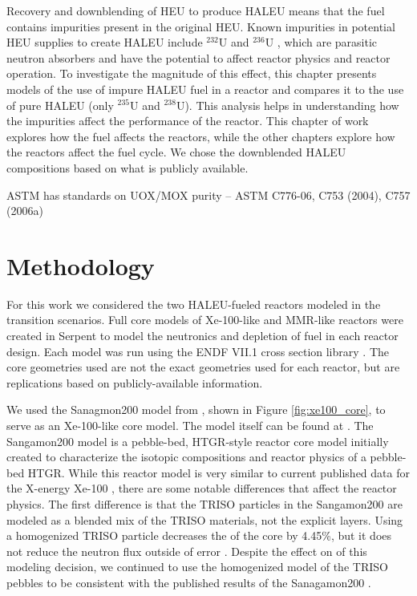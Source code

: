 Recovery and downblending of \gls{HEU} to produce \gls{HALEU} means that 
the fuel contains impurities present in the original
\gls{HEU}. Known impurities in potential \gls{HEU}
supplies to create \gls{HALEU} include $^{232}$U and $^{236}$U
\cite{vaden_isotopic_2018,nelson_foreign_2010},  
which are parasitic neutron absorbers and have the potential to affect 
reactor physics and reactor operation. To investigate the magnitude of this 
effect, this chapter presents models of the use of 
impure \gls{HALEU} fuel in a reactor and compares it to the use of pure 
\gls{HALEU} (only $^{235}$U and $^{238}$U). This analysis helps in 
understanding how the impurities affect the performance of the reactor.
This chapter of work explores how the fuel affects the reactors, while 
the other chapters explore how the reactors affect the fuel cycle. We chose 
the downblended \gls{HALEU} compositions based on what is publicly 
available. 




ASTM has standards on UOX/MOX purity -- ASTM C776-06, C753 (2004), C757 (2006a)

\section{Methodology}
For this work we considered the two \gls{HALEU}-fueled reactors modeled 
in the transition scenarios. Full core models of Xe-100-like and 
\gls{MMR}-like reactors were created in Serpent 
\cite{leppanen_serpent_2014} to model the neutronics and depletion of fuel 
in each reactor design. Each model was run using the ENDF VII.1 
cross section library
\cite{chadwick_endfb-vii1_2011}. The core geometries used are not 
the exact geometries used for each reactor, but are replications based 
on publicly-available information. 

We used the Sanagmon200 model from \cite{richter_isotopic_2022}, shown in 
Figure \ref{fig:xe100_core}, to serve as an Xe-100-like 
core model. The model itself can be found at \cite{richter_zoerichterphlox_2022}.
The Sangamon200 model is a pebble-bed, \gls{HTGR}-style reactor core model 
initially created to characterize the isotopic compositions and 
reactor physics of a pebble-bed \gls{HTGR}. While this reactor model 
is very similar to current published data for the X-energy Xe-100
\cite{mulder_overview_2021}, there are some notable differences that affect 
the reactor physics. The first difference is that the \gls{TRISO} particles 
in the Sangamon200 are modeled as a blended mix of the \gls{TRISO} 
materials, not the explicit layers. Using a homogenized \gls{TRISO} particle 
decreases the \keff of the core by 4.45\%, but it does not reduce the 
neutron flux outside of error \cite{richter_isotopic_2022}. Despite 
the effect on \keff of this modeling decision, we continued to use the 
homogenized model of the \gls{TRISO} pebbles to be consistent with the 
published results of the Sanagamon200 \cite{richter_isotopic_2022}. 

